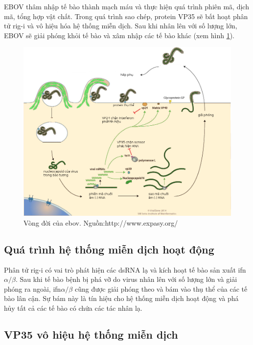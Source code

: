 \documentclass[12pt,a4paper,reqno, oneside]{book}
\begin{document}
		EBOV thâm nhập tế bào thành mạch máu và thực hiện quá trình phiên mã, dịch mã, tổng hợp vật chất. Trong quá trình sao chép, protein VP35 sẽ bất hoạt phân tử \gls{rig-i} và vô hiệu hóa hệ thống miễn dịch. Sau khi nhân lên với số lượng lớn, EBOV sẽ giải phóng khỏi tế bào và xâm nhập các tế bào khác\cite{Colebunders2000} (xem hình \ref{fig:viruscycle}).
		\begin{figure}[t]
		\centering
		\includegraphics[width=1.0\textwidth,natwidth=610,natheight=642]{Ebolavirus_cycle.png}
		\caption{Vòng đời của \gls{ebov}. Nguồn:http://www.expasy.org/}
		\label{fig:viruscycle}
		\end{figure}
\subsection{Quá trình hệ thống miễn dịch hoạt động}

		Phân tử \gls{rig-i} có vai trò phát hiện các dsRNA lạ và kích hoạt tế bào sản xuất \gls{ifn}$\alpha / \beta$\cite{Cardenas2006}. Sau khi tế bào bệnh bị phá vỡ do virus nhân lên với số lượng lớn và giải phóng ra ngoài, \gls{ifn}$\alpha / \beta$ cũng được giải phóng theo và bám vào thụ thể của các tế bào lân cận. Sự bám này là tín hiệu cho hệ thống miễn dịch hoạt động và phá hủy tất cả các tế bào có chứa các tác nhân lạ.\cite{DeAndrea2002}
%		
\subsection{VP35 vô hiệu hệ thống miễn dịch}
\end{document}
